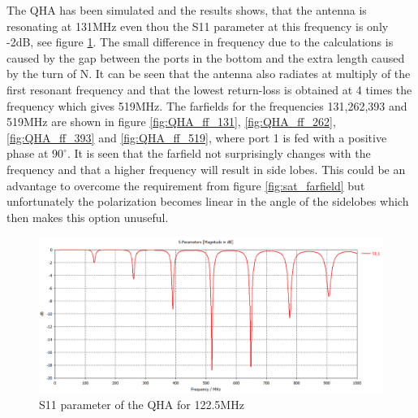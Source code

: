 The QHA has been simulated and the results shows, that the antenna is resonating at 131MHz even thou the S11 parameter at this frequency is only -2dB, see figure \ref{fig:QHA_S11}. The small difference in frequency due to the calculations is caused by the gap between the ports in the bottom and the extra length caused by the turn of N. It can be seen that the antenna also radiates at multiply of the first resonant frequency and that the lowest return-loss is obtained at 4 times the frequency which gives 519MHz. The farfields for the frequencies 131,262,393 and 519MHz are shown in figure \ref{fig:QHA_ff_131}, \ref{fig:QHA_ff_262}, \ref{fig:QHA_ff_393} and \ref{fig:QHA_ff_519}, where port 1 is fed with a positive phase at $90^\circ$. It is seen that the farfield not surprisingly changes with the frequency and that a higher frequency will result in side lobes. This could be an advantage to overcome the requirement from figure \ref{fig:sat_farfield} but unfortunately the polarization becomes linear in the angle of the sidelobes which then makes this option unuseful.        

\begin{figure}[H]
\centering 
\includegraphics[scale = 0.4]{figures/antennas/qha/qha_6_S11}
\caption{S11 parameter of the QHA for 122.5MHz}
\label{fig:QHA_S11}
\end{figure}

